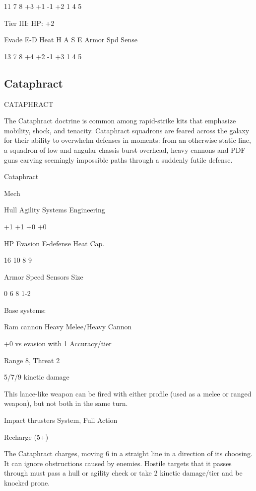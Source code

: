          11        7      8       +3   +1    -1    +2       1           4         5 

Tier III:  
HP: +2
 

          Evade     E-D    Heat    H    A     S     E       Armor        Spd       Sense 

          13        7      8       +4   +2    -1    +3       1           4         5 

                                                                                                                

\subsection{Cataphract}
                                            CATAPHRACT  

The Cataphract doctrine is common among rapid-strike kits that emphasize mobility, shock, and  
tenacity. Cataphract squadrons are feared across the galaxy for their ability to overwhelm  
defenses in moments: from an otherwise static line, a squadron of low and angular chassis burst  
overhead, heavy cannons and PDF guns carving seemingly impossible paths through a suddenly  
futile defense. 
 

 Cataphract 

 Mech 

 Hull       Agility      Systems       Engineering 

 +1         +1           +0            +0 

 HP         Evasion      E-defense     Heat Cap. 

 16         10           8             9 

 Armor      Speed        Sensors       Size 

 0          6            8             1-2 

Base systems:
 
Ram cannon  
Heavy Melee/Heavy Cannon
 
+0 vs evasion with 1 Accuracy/tier
 
Range 8, Threat 2
 
5/7/9 kinetic damage
 
This lance-like weapon can be fired with either profile (used as a melee or ranged weapon), but  
not both in the same turn.
 

Impact thrusters  
System, Full Action
 
Recharge (5+)
 
The Cataphract charges, moving 6 in a straight line in a direction of its choosing. It can ignore  
obstructions caused by enemies. Hostile targets that it passes through must pass a hull or agility  
check or take 2 kinetic damage/tier and be knocked prone.
 


